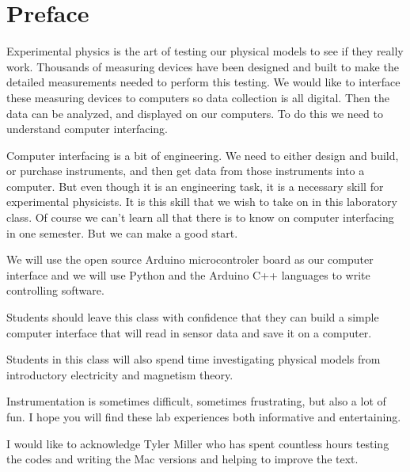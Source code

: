 \chapter*{Preface}

Experimental physics is the art of testing our physical models to see if they really work. Thousands of measuring devices have been designed and built to make the detailed measurements needed to perform this testing. We would like to interface these measuring devices to computers so data collection is all digital. Then the data can be analyzed, and displayed on our computers. To do this we need to understand computer interfacing.

Computer interfacing is a bit of engineering. We need to either design and build, or purchase instruments, and then get data from those instruments into a computer. But even though it is an engineering task, it is a necessary skill for experimental physicists. It is this skill that we wish to take on in this laboratory class. Of course we can't learn all that there is to know on computer interfacing in one semester. But we can make a good start.

We will use the open source Arduino microcontroler board as our computer interface and we will use Python and the Arduino C++ languages to write controlling software.

Students should leave this class with confidence that they can build a simple computer interface that will read in sensor data and save it on a computer.

Students in this class will also spend time investigating physical models from introductory electricity and magnetism theory.

Instrumentation is sometimes difficult, sometimes frustrating, but also a lot of fun. I hope you will find these lab experiences both informative and entertaining. 

I would like to acknowledge Tyler Miller who has spent countless hours testing the codes and writing the Mac versions and helping to improve the text. 
